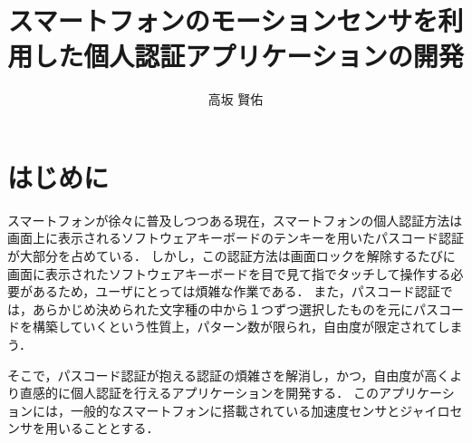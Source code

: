 \documentclass[11pt]{jarticle}
\title{スマートフォンのモーションセンサを利用した個人認証アプリケーションの開発}
\author{高坂 賢佑}
\begin{document}
\maketitle

\section{はじめに}
スマートフォンが徐々に普及しつつある現在，スマートフォンの個人認証方法は画面上に表示されるソフトウェアキーボードのテンキーを用いたパスコード認証が大部分を占めている．
しかし，この認証方法は画面ロックを解除するたびに画面に表示されたソフトウェアキーボードを目で見て指でタッチして操作する必要があるため，ユーザにとっては煩雑な作業である．
また，パスコード認証では，あらかじめ決められた文字種の中から１つずつ選択したものを元にパスコードを構築していくという性質上，パターン数が限られ，自由度が限定されてしまう．

そこで，パスコード認証が抱える認証の煩雑さを解消し，かつ，自由度が高くより直感的に個人認証を行えるアプリケーションを開発する．
このアプリケーションには，一般的なスマートフォンに搭載されている加速度センサとジャイロセンサを用いることとする．
\end{document}
